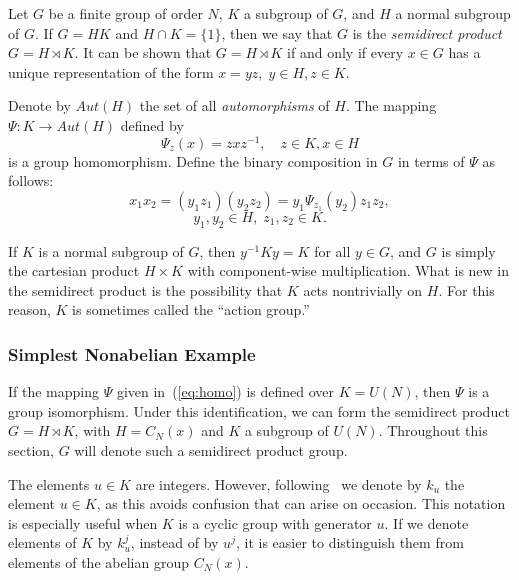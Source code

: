\documentclass[reqno,onecolumn,oneside]{paper}
\newcommand{\<}{\ensuremath{\langle}}
\renewcommand{\>}{\ensuremath{\rangle}}
\newcommand{\sdp}{\ensuremath{\rtimes}}
\begin{document}
Let $G$ be a finite group of order $N$, $K$ a subgroup of $G$,
and $H$ a normal subgroup of $G$. If $G = HK$ and $H \cap
K = \{1\}$, then we say that $G$ is the 
\emph{semidirect product} $G = H \sdp K$. 
It can be shown that $G = H \sdp K$ if and only if every $x \in
G$ has a unique representation of the form $x = yz, \; y\in H,
z\in K$.

Denote by $Aut(H)$ the set of all \emph{automorphisms} of
$H$. The mapping $\Psi:K\rightarrow Aut(H)$ defined by  
\begin{equation}\label{eq:homo}
\Psi_z(x) = zxz^{-1}, \quad z\in K, x\in H
\end{equation}
is a group homomorphism. 
Define the binary composition in $G$
in terms of $\Psi$ as follows:
\begin{equation}\label{eq:PsiProd}
x_1x_2 = (y_1z_1)(y_2z_2)= y_1\Psi_{z_1}(y_2)z_1z_2,
\end{equation}
\[
y_1, y_2 \in H,\; z_1, z_2 \in K. 
\]

If $K$ is a normal subgroup of $G$,
then $y^{-1}Ky = K$ for all $y\in G$, 
and $G$ is simply the cartesian product $H\times K$ 
with component-wise multiplication. 
What is new in the semidirect product is
the possibility that $K$ acts nontrivially on $H$. 
For this reason, $K$ is sometimes called the ``action group.''

\subsubsection{Simplest Nonabelian Example}
If the mapping $\Psi$ given in~(\ref{eq:homo}) is defined over
$K=U(N)$, then $\Psi$ is a group isomorphism.
Under this identification, we can form the semidirect
product $G = H\sdp K$, with $H = C_N(x)$ and $K$ a
subgroup of $U(N)$.  Throughout this section, $G$ will
denote such a semidirect product group.

The elements $u\in K$ are integers. However, following~\cite{An:2003} we
denote by $k_u$ the element $u\in K$, as this avoids confusion that can arise 
on occasion. This notation is especially useful when $K$ 
is a cyclic group with generator $u$.  If  we denote elements of $K$ by $k_u^j$, instead of 
by $u^j$, it is easier to distinguish them from elements of the abelian group $C_N(x)$.
\end{document}
